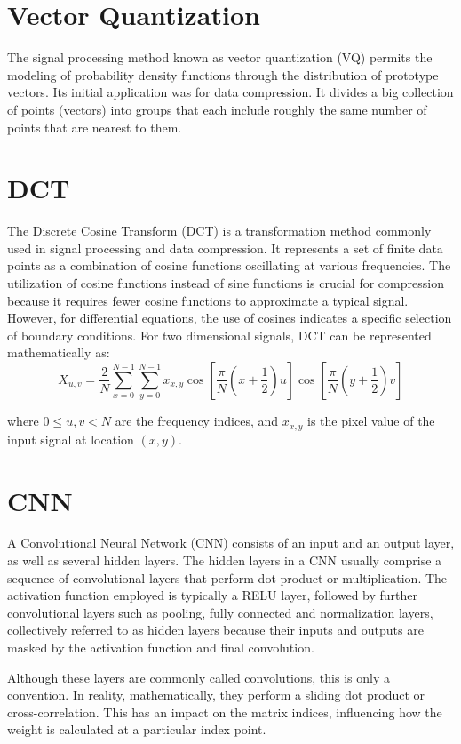 \documentclass[12pt]{report}
\begin{document}
\section{Vector Quantization}
The signal processing method known as vector quantization (VQ) permits the modeling of probability density functions through the distribution of prototype vectors. Its initial application
was for data compression. It divides a big collection of points (vectors) into groups that each include roughly the same number of points that are nearest to them.
\section{DCT}
The Discrete Cosine Transform (DCT) is a transformation method commonly used in signal processing and data compression. It represents a set of finite data points as a combination of cosine functions oscillating at various frequencies. The utilization of cosine functions instead of sine functions is crucial for compression because it requires fewer cosine functions to approximate a typical signal. However, for differential equations, the use of cosines indicates a specific selection of boundary conditions.
For two dimensional signals, DCT can be represented mathematically as:
$$X_{u,v} = \frac{2}{N} \sum_{x=0}^{N-1} \sum_{y=0}^{N-1} x_{x,y} \cos \left[ \frac{\pi}{N} \left(x + \frac{1}{2} \right) u \right] \cos \left[ \frac{\pi}{N} \left(y + \frac{1}{2} \right) v \right]$$

where $0 \leq u,v < N$ are the frequency indices, and $x_{x,y}$ is the pixel value of the input signal at location $(x,y)$.
\section{CNN}
A Convolutional Neural Network (CNN) consists of an input and an output layer, as well as several hidden layers. The hidden layers in a CNN usually comprise a sequence of convolutional layers that perform dot product or multiplication. The activation function employed is typically a RELU layer, followed by further convolutional layers such as pooling, fully connected and normalization layers, collectively referred to as hidden layers because their inputs and outputs are masked by the activation function and final convolution.

Although these layers are commonly called convolutions, this is only a convention. In reality, mathematically, they perform a sliding dot product or cross-correlation. This has an impact on the matrix indices, influencing how the weight is calculated at a particular index point.\\
\end{document}
